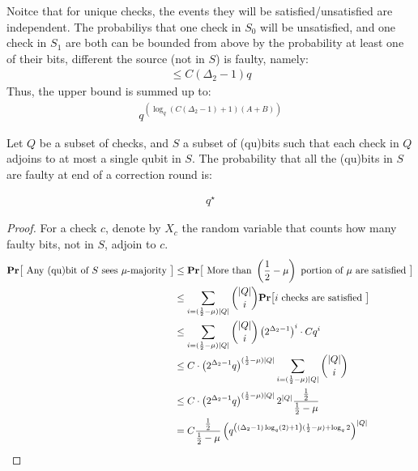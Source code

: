 \documentclass[manuscript,screen,review]{acmart}
\begin{document}
Noitce that for unique checks, the events they will be satisfied/unsatisfied are independent. The probabiliys that one check in $S_{0}$ will be unsatisfied, and one check in $S_{1}$ are both can be bounded from above by the probability at least one of their bits, different the source (not in $S$) is faulty, namely: 
\begin{equation*}
  \begin{split}
    \le C (\Delta_{2} - 1) q   
  \end{split}
\end{equation*}
Thus, the upper bound is summed up to: 
\begin{equation*}
  \begin{split}
    q^{\left(  \log_{q} \left( C ( \Delta_{2} - 1) + 1\right) (A+B)    \right)} 
  \end{split}
\end{equation*}



\begin{claim}  
  \label{claim:ind}
  Let $Q$ be a subset of checks, and $S$ a subset of (qu)bits such that each check in $Q$ adjoins to at most a single qubit in $S$. The probability that all the (qu)bits in $S$ are faulty at end of a correction round is: 

  \begin{equation*}
    \begin{split}
      q^{\star}
    \end{split}
  \end{equation*}

\end{claim}

\begin{proof}
  
  For a check $c$, denote by $X_{c}$ the random variable that counts how many faulty bits, not in $S$, adjoin to $c$. 
  \begin{equation*}
    \begin{split}
      \mathbf{Pr} \big[  \text{  Any (qu)bit of }  S \text{ sees } \mu \text{-majority }  \big] &  \le  \mathbf{Pr} \big[  \text{  More than  } \left( \frac{1}{2} - \mu \right)   \text{ portion of  } \mu \text{ are satisfied }  \big]  \\
      & \le \sum_{i = (\frac{1}{2} - \mu ) |Q|}{{|Q| \choose  i }  \mathbf{Pr} \big[  i \text{ checks are satisfied }  \big] } \\ 
      & \le  \sum_{i = (\frac{1}{2} - \mu ) |Q|} {   {|Q| \choose  i }  \left( 2^{\Delta_{2} - 1}\right)^{i} \cdot C q^{i}  } \\ 
        & \le  C \cdot \left( 2^{\Delta_{2} - 1} q \right)^{(\frac{1}{2} - \mu ) |Q|} \sum_{i = (\frac{1}{2} - \mu ) |Q|} {   {|Q| \choose  i } }  \\ 
        & \le    C \cdot \left( 2^{\Delta_{2} - 1} q \right)^{(\frac{1}{2} - \mu ) |Q|}  2^{|Q|} \frac{\frac{1}{2}}{\frac{1}{2} - \mu} \\ 
        & = C \frac{\frac{1}{2}}{\frac{1}{2} - \mu} \left(  q^{     \left(   \left( \Delta_{2} - 1 \right) \log_{q}(2)  +   1 \right) (\frac{1}{2} - \mu ) + \log_{q}2 } \right)^{|Q|}
    \end{split}
  \end{equation*}
\end{proof}
\end{document}
